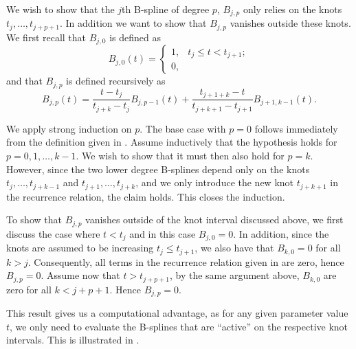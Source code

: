 \documentclass[a4paper]{article}
\begin{document}
    We wish to show that the $j$th B-spline of degree $p$, $B_{j, p}$ only
    relies on the knots $t_j, \ldots, t_{j+p+1}$. In addition we want to show
    that $B_{j, p}$ vanishes outside these knots.  We first recall that $B_{j,
    0}$ is defined as
    \begin{equation}
        \label{eq:def}
        B_{j, 0}(t) = \begin{cases}
            1, & t_j \leq t < t_{j+1};\\
            0,
        \end{cases}
    \end{equation}
    and that $B_{j, p}$ is defined recursively as
    \begin{equation}
        \label{eq:rec}
        B_{j, p}(t) = \frac{t - t_j}{t_{j+k} - t_j}B_{j, p-1}(t) + \frac{t_{j+1+k} - t}{t_{j+k+1} - t_{j+1}} B_{j+1, k-1}(t).
    \end{equation}

    We apply strong induction on $p$. The base case with $p = 0$ follows
    immediately from the definition given in . Assume inductively
    that the hypothesis holds for $p = 0, 1, \ldots, k - 1$. We wish to show
    that it must then also hold for $p = k$. However, since the two lower
    degree B-splines depend only on the knots $t_j, \ldots, t_{j+k-1}$ and
    $t_{j + 1}, \ldots, t_{j+k}$, and we only introduce the new knot
    $t_{j+k+1}$ in the recurrence relation, the claim holds. This closes the
    induction.
    
    To show that $B_{j, p}$ vanishes outside of the knot interval discussed
    above, we first discuss the case where $t < t_j$ and in this case $B_{j,0}
    = 0$. In addition, since the knots are assumed to be increasing $t_j \leq
    t_{j+1}$, we also have that $B_{k, 0} = 0$ for all $k > j$. Consequently,
    all terms in the recurrence relation given in  are zero, hence
    $B_{j, p} = 0$.  Assume now that $t > t_{j+p+1}$, by the same argument
    above, $B_{k, 0}$ are zero for all $k < j + p + 1$. Hence $B_{j, p} = 0$.

    This result gives us a computational advantage, as for any given parameter
    value $t$, we only need to evaluate the B-splines that are ``active'' on
    the respective knot intervals. This is illustrated in
    .
\end{document}
